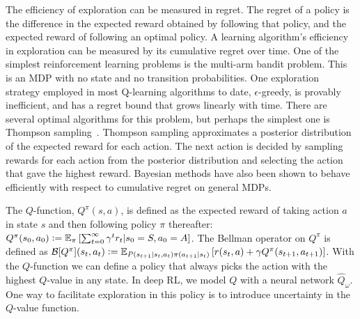 \documentclass[]{uai2022} %
\newcommand{\defeq}{\vcentcolon=}
\newcommand{\E}{\mathbb{E}}
\newcommand{\B}{\mathcal{B}}
\begin{document}
The efficiency of exploration can be measured in regret.
The regret of a policy is the difference in the expected reward obtained by
following that policy, and the expected reward of following an optimal policy.
A learning algorithm's efficiency in exploration can be measured by its
cumulative regret over time. One of the simplest reinforcement learning 
problems is the multi-arm bandit problem. This is an MDP with no state and no
transition probabilities. One exploration strategy employed in most Q-learning
algorithms to date, \(\epsilon\)-greedy, is provably inefficient, and has a
regret bound that grows linearly with time. There are several optimal algorithms
for this problem, but perhaps the simplest one is Thompson sampling~\citep{thompson_likelihood_1933}.
Thompson sampling approximates a posterior distribution of the expected reward
for each action. The next action is decided by sampling rewards for each action
from the posterior distribution and selecting the action that gave the highest
reward. Bayesian methods have also been shown to behave efficiently with respect
to cumulative regret \cite{osband_generalization_2016} on general MDPs.


The \(Q\)-function, \(Q^\pi(s,a)\), is defined as the expected reward of taking action
\(a\) in state \(s\) and then following policy \(\pi\) thereafter:
\(Q^\pi(s_0, a_0) \defeq \E_\pi \left[ \sum_{t=0}^\infty \gamma^t r_t \vert s_0=S, a_0=A \right]\).
The Bellman operator on \(Q^\pi\) is defined as
\(\B[Q^\pi](s_t,a_t) \defeq \E_{P(s_{t+1} \vert s_t, a_t)\pi(a_{t+1} \vert s_t)}
\left[ r(s_t, a) + \gamma Q^\pi(s_{t+1}, a_{t+1}) \right]\). With the
\(Q\)-function we can define a policy that always picks the action with the 
highest \(Q\)-value in any state. In deep RL, we model \(Q\) with a
neural network \(\hat{Q}_\omega\). One way to facilitate exploration in this
policy is to introduce uncertainty in the
\(Q\)-value function.
\end{document}
